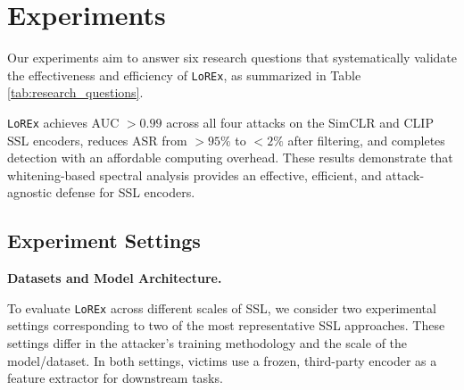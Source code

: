 \documentclass[letterpaper,twocolumn,10pt]{article}
\begin{document}
\section{Experiments}
\label{Section5}

\par Our experiments aim to answer six research questions that systematically validate the effectiveness and efficiency of \texttt{LoREx}, as summarized in Table \ref{tab:research_questions}.

\begin{table}[h]
    \centering
    \caption{Research questions and key findings.}
    \label{tab:research_questions}
\end{table}


\texttt{LoREx} achieves AUC $>0.99$ across all four attacks on the SimCLR and CLIP SSL encoders, reduces ASR from $>95\%$ to $<2\%$ after filtering, and completes detection with an affordable computing overhead. These results demonstrate that whitening-based spectral analysis provides an effective, efficient, and attack-agnostic defense for SSL encoders.

\subsection{Experiment Settings}
\label{exp_setting}

\par \textbf{Datasets and Model Architecture.}

To evaluate \texttt{LoREx} across different scales of SSL, we consider two experimental settings corresponding to two of the most representative SSL approaches. These settings differ in the attacker's training methodology and the scale of the model/dataset. In both settings, victims use a frozen, third-party encoder as a feature extractor for downstream tasks. 
\end{document}
